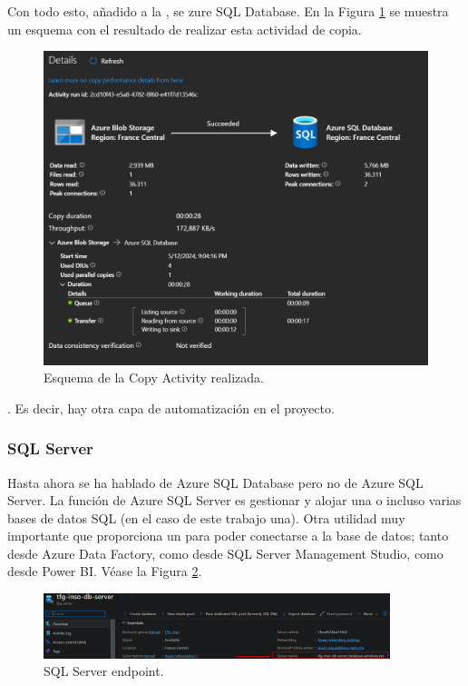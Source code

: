 Con todo esto, añadido a la , se zure SQL Database. En la Figura \ref{DataFactory} se muestra un esquema con el resultado de realizar esta actividad de copia.

\begin{figure}[H]
    \centering
    \includegraphics[scale = 0.4]{imgs/move_data_squema.png}
    \caption{Esquema de la Copy Activity realizada.}
    \label{DataFactory}
\end{figure}

. Es decir, hay otra capa de automatización en el proyecto.

\subsubsection{SQL Server}
Hasta ahora se ha hablado de Azure SQL Database pero no de Azure SQL Server. La función de Azure SQL Server es gestionar y alojar una o incluso varias bases de datos SQL (en el caso de este trabajo una). Otra utilidad muy importante que proporciona un  para poder conectarse a la base de datos; tanto desde Azure Data Factory, como desde SQL Server Management Studio, como desde Power BI. Véase la Figura \ref{serverEndpoint}.

\begin{figure}[H]
    \centering
    \includegraphics[width = 0.9\textwidth]{imgs/serverEndpoint.png}
    \caption{SQL Server endpoint.}
    \label{serverEndpoint}
\end{figure}

